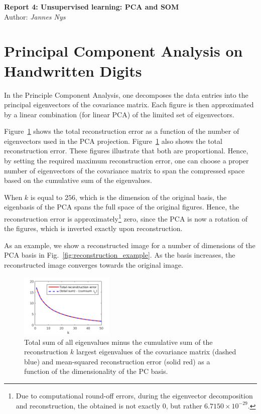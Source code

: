 \documentclass[11pt,a4paper]{article}
\begin{document}
\begin{center}
\Large\textbf{Report 4: Unsupervised learning: PCA and SOM}\\
\large Author: \textit{Jannes Nys}
\end{center}


\section{Principal Component Analysis on Handwritten Digits}
In the Principle Component Analysis, one decomposes the data entries into the principal eigenvectors of the covariance matrix. Each figure is then approximated by a linear combination (for linear PCA) of the limited set of eigenvectors.

Figure~\ref{fig:recon_and_cumsum} shows the total reconstruction error as a function of the number of eigenvectors used in the PCA projection. Figure~\ref{fig:recon_and_cumsum} also shows the total reconstruction error. These figures illustrate that both are proportional. Hence, by setting the required maximum reconstruction error, one can choose a proper number of eigenvectors of the covariance matrix to span the compressed space based on the cumulative sum of the eigenvalues.

When $k$ is equal to $256$, which is the dimension of the original basis, the eigenbasis of the PCA spans the full space of the original figures. Hence, the reconstruction error is approximately\footnote{Due to computational round-off errors, during the eigenvector decomposition and reconstruction, the obtained is not exactly $0$, but rather $6.7150 \times 10^{-29}$.} zero, since the PCA is now a rotation of the figures, which is inverted exactly upon reconstruction.

As an example, we show a reconstructed image for a number of dimensions of the PCA basis in Fig.~\ref{fig:reconstruction_example}. As the basis increases, the reconstructed image converges towards the original image.

\begin{figure}[htb]
\centering
\includegraphics[width=0.4\textwidth]{figs/recon_and_cumsum.png}
\caption{Total sum of all eigenvalues minus the cumulative sum of the reconstruction $k$ largest eigenvalues of the covariance matrix (dashed blue) and mean-squared reconstruction error (solid red) as a function of the dimensionality of the PC basis.\label{fig:recon_and_cumsum}}
\end{figure}
\end{document}
